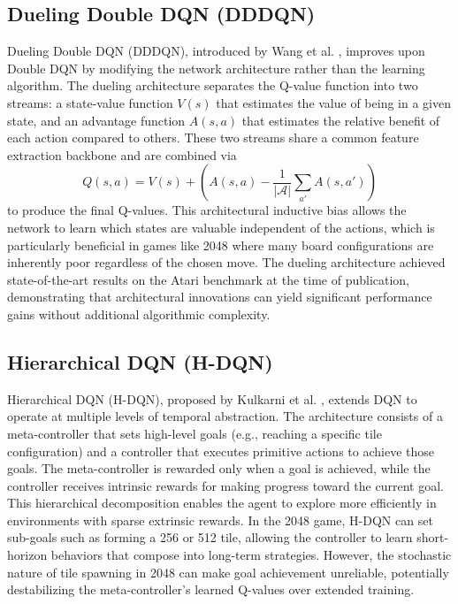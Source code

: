 \documentclass[conference]{IEEEtran}
\begin{document}
\subsection{Dueling Double DQN (DDDQN)}

Dueling Double DQN (DDDQN), introduced by Wang et al. \cite{wang2016dueling}, improves upon Double DQN by modifying the network architecture rather than the learning algorithm. The dueling architecture separates the Q-value function into two streams: a state-value function $V(s)$ that estimates the value of being in a given state, and an advantage function $A(s, a)$ that estimates the relative benefit of each action compared to others. These two streams share a common feature extraction backbone and are combined via
\begin{equation}\label{eq:dueling}
Q(s, a) = V(s) + \left(A(s, a) - \frac{1}{|\mathcal{A}|}\sum_{a'} A(s, a')\right)
\end{equation}
to produce the final Q-values. This architectural inductive bias allows the network to learn which states are valuable independent of the actions, which is particularly beneficial in games like 2048 where many board configurations are inherently poor regardless of the chosen move. The dueling architecture achieved state-of-the-art results on the Atari benchmark at the time of publication, demonstrating that architectural innovations can yield significant performance gains without additional algorithmic complexity.

\subsection{Hierarchical DQN (H-DQN)}

Hierarchical DQN (H-DQN), proposed by Kulkarni et al. \cite{kulkarni2016hierarchical}, extends DQN to operate at multiple levels of temporal abstraction. The architecture consists of a meta-controller that sets high-level goals (e.g., reaching a specific tile configuration) and a controller that executes primitive actions to achieve those goals. The meta-controller is rewarded only when a goal is achieved, while the controller receives intrinsic rewards for making progress toward the current goal. This hierarchical decomposition enables the agent to explore more efficiently in environments with sparse extrinsic rewards. In the 2048 game, H-DQN can set sub-goals such as forming a 256 or 512 tile, allowing the controller to learn short-horizon behaviors that compose into long-term strategies. However, the stochastic nature of tile spawning in 2048 can make goal achievement unreliable, potentially destabilizing the meta-controller's learned Q-values over extended training.
\end{document}

